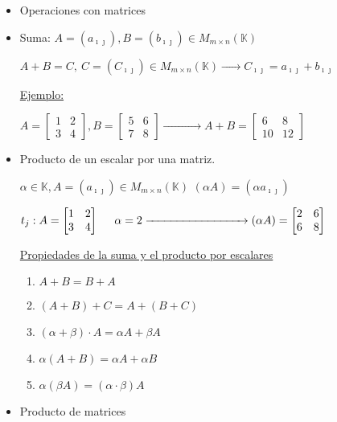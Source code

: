 \documentclass[12pt]{article}
\begin{document}
\begin{itemize}[label=\color{red}\textbullet, leftmargin=*]
    \item \color{lightblue} Operaciones con matrices
\end{itemize}
\begin{itemize}[label=$\longrightarrow$]
\item Suma: $A=(a_{\imath\jmath  }), B=(b_{\imath\jmath  })\in M_{m\times
n}(\mathbb{K})$

$A+B=C,~C=(C_{\imath\jmath  })\in M_{m\times
n}(\mathbb{K})\xrightarrow{\hspace{1cm}}C_{\imath\jmath  }=a_{\imath\jmath  }+b_{\imath\jmath  }$

          \underline{Ejemplo:}

          $A=\begin{bmatrix}
                  1 & 2 \\
                  3 & 4
              \end{bmatrix}, B=\begin{bmatrix}
                  5 & 6 \\
                  7 & 8
\end{bmatrix}\xrightarrow{\hspace{2cm}}A+B=\begin{bmatrix}                  6  & 8  \\
                  10 & 12
              \end{bmatrix} $

    \item Producto de un escalar por una matriz.

$\alpha\in\mathbb{K}, A=(a_{\imath\jmath  })\in M_{m\times n}(\mathbb{K})$
          $(\alpha A)=(\alpha a_{\imath\jmath  })$

          $t_j:A=\begin{bmatrix}
                  1 & 2 \\
                  3 & 4
\end{bmatrix}\hspace{0.5cm}\alpha=2\xrightarrow{\hspace{3cm}}(\alpha
A)=\begin{bmatrix}
                  2 & 6 \\
                  6 & 8
              \end{bmatrix}$

\underline{Propiedades de la suma y el producto por escalares}
          \begin{enumerate}
              \item $A+B=B+A$
              \item $(A+B)+C=A+(B+C)$
              \item $(\alpha + \beta)\cdot A=\alpha A+\beta A$
              \item $\alpha(A+B)=\alpha A+\alpha B$
              \item $\alpha(\beta A)=(\alpha\cdot\beta)A$
          \end{enumerate}
    \item Producto de matrices


\end{itemize}
\end{document}
